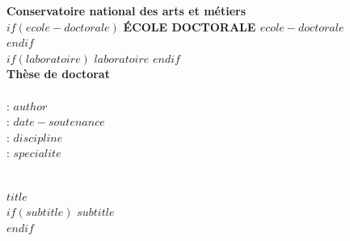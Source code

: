 \begin{minipage}{\textwidth}
\begin{center}
\vspace{1cm}
\textbf{Conservatoire national des arts et métiers} \\
\vspace{0.5cm}
$if(ecole-doctorale)$
\textbf{ÉCOLE DOCTORALE \MakeUppercase{$ecole-doctorale$}} \\
$endif$
~\\
$if(laboratoire)$
\vspace{0.1cm}
\textbf{$laboratoire$}
\vspace{0.5cm}
$endif$
~\\
{\Huge \textbf{Thèse de doctorat}}
~\\
\vspace{0.5cm}
~\\
 : \textbf{$author$} \\
\vspace{0.1cm}
 : \textbf{$date-soutenance$} \\
\vspace{0.1cm}
 : \textbf{$discipline$} \\
\vspace{0.1cm}
 : \textbf{$specialite$} \\
\end{center}
\end{minipage}

\vspace{1cm}
\begin{center}
\begin{tcolorbox}[
  width=16.5cm,
  colback=white,
  colframe=redHESAM,
  boxrule=0.8pt,
  arc=6pt,
  left=6pt, right=6pt,
  top=4pt, bottom=4pt,
  halign=center,
]
\vspace{0.2cm}
~\\
{\LARGE\textbf{\MakeUppercase{$title$}}}
~\\
$if(subtitle)$
\vspace{0.4cm}
{\LARGE \textbf{$subtitle$}}
~\\
$endif$
\vspace{0.2cm}
\end{tcolorbox}
\end{center}
\vspace{0.8cm}

